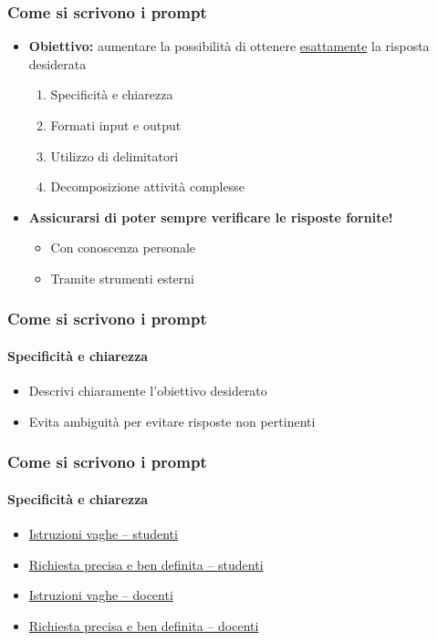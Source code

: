 \begin{contentframe}
    \frametitle{Come si scrivono i prompt}

    \begin{itemize}
        \item \textbf{Obiettivo:} aumentare la possibilità di ottenere \underline{esattamente} la risposta desiderata
        \begin{enumerate}%
            \item Specificità e chiarezza
            \item Formati input e output
            \item Utilizzo di delimitatori
            \item Decomposizione attività complesse
        \end{enumerate}
        
        \bigskip
        \item \textbf{Assicurarsi di poter sempre verificare le risposte fornite!}
        \begin{itemize}
            \item Con conoscenza personale
            \item Tramite strumenti esterni
        \end{itemize}
    \end{itemize}
\end{contentframe}

\begin{contentframe}
    \frametitle{Come si scrivono i prompt}
    \framesubtitle{Specificità e chiarezza}

    \begin{itemize}
        \item Descrivi chiaramente l'obiettivo desiderato

        \bigskip
        \item Evita ambiguità per evitare risposte non pertinenti
    \end{itemize}
\end{contentframe}

\begin{exampleframe}
    \frametitle{Come si scrivono i prompt}
    \framesubtitle{Specificità e chiarezza}

    \begin{itemize}
        \item \href{https://chatgpt.com/share/6759a98f-8218-8003-9eb8-bf85e9699044}{Istruzioni vaghe -- studenti}
        \item \href{https://chatgpt.com/share/6759aa0f-1404-8003-b15e-0330328e1803}{Richiesta precisa e ben definita -- studenti}

        \bigskip
        \item \href{https://chatgpt.com/share/6759aa68-0ba4-8003-ae44-d856b0014d10}{Istruzioni vaghe -- docenti}
        \item \href{https://chatgpt.com/share/6759ab31-c6c0-8003-a3aa-8c06ddf5ee13}{Richiesta precisa e ben definita -- docenti}
    \end{itemize}
\end{exampleframe}

